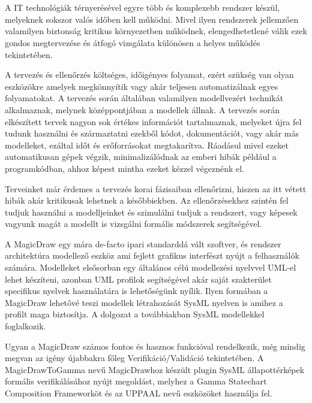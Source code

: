 \chapter{\bevezetes}

A IT technológiák térnyerésével egyre több és komplexebb rendszer készül, melyeknek sokszor valós időben kell működni. Mivel ilyen rendszerek jellemzően valamilyen biztonság kritikus környezetben működnek, elengedhetetlené válik ezek gondos megtervezése és átfogó vizsgálata különösen a helyes működés tekintetében.

A tervezés és ellenőrzés költséges, időigényes folyamat, ezért szükség van olyan eszközökre amelyek megkönnyítik vagy akár teljesen automatizálnak egyes folyamatokat. A tervezés során általában valamilyen modellvezért technikát alkalmaznak, melynek középpontjában a modellek állnak. A tervezés során elkészített tervek nagyon sok értékes információt tartalmaznak, melyeket újra fel tudunk használni és származtatni ezekből kódot, dokumentációt, vagy akár más modelleket, ezáltal időt és erőforrásokat megtakarítva. Ráadásul mivel ezeket automatikusan gépek végzik, minimalizálódnak az emberi hibák például a programkódban, ahhoz képest mintha ezeket kézzel végeznénk el.

Terveinket már érdemes a tervezés korai fázisaiban ellenőrizni, hiszen az itt vétett hibák akár kritikusak lehetnek a későbbiekben. Az ellenőrzésekhez szintén fel tudjuk használni a modelljeinket és szimulálni tudjuk a rendszert, vagy képesek vagyunk magát a modellt is vizsgálni formális módszerek segítségével.

A MagicDraw egy mára de-facto ipari standarddá vált szoftver, és rendszer architektúra modellező eszköz ami fejlett grafikus interfészt nyújt a felhasználók számára. Modelleket elsősorban egy általános célú modellezési nyelvvel UML-el lehet készíteni, azonban UML profilok segítségével akár saját szakterület specifikus nyelvek használatára is lehetőségünk nyílik. Ilyen formában a MagicDraw lehetővé teszi modellek létrahozását SysML nyelven is amihez a profilt maga biztosítja. A dolgozat a továbbiakban SysML modellekkel foglalkozik.

Ugyan a MagicDraw számos fontos és hasznos funkcióval rendelkezik, még mindig megvan az igény újabbakra főleg Verifikáció/Validáció tekintetében. A MagicDrawToGamma nevű MagicDrawhoz készült plugin SysML állapottérképek formális verifikálásához nyújt megoldást, melyhez a Gamma Statechart Composition Frameworköt és az UPPAAL nevű eszközöket használja fel.

